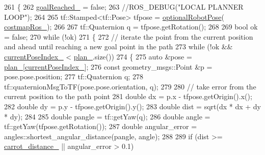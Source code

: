 \begin{DoxyCode}
261 \{
262     \hyperlink{classcl__move__base__z_1_1forward__local__planner_1_1ForwardLocalPlanner_a9d51ad6f0eb364ebd830526280bdf4fc}{goalReached\_} = \textcolor{keyword}{false};
263     \textcolor{comment}{//ROS\_DEBUG("LOCAL PLANNER LOOP");}
264 
265     tf::Stamped<tf::Pose> tfpose = \hyperlink{namespacecl__move__base__z_1_1forward__local__planner_a4c20f9fe0ca67779c53e90182baf4997}{optionalRobotPose}(
      \hyperlink{classcl__move__base__z_1_1forward__local__planner_1_1ForwardLocalPlanner_a37791fea67ce92c6e38e3727311e533b}{costmapRos\_});
266 
267     tf::Quaternion q = tfpose.getRotation();
268 
269     \textcolor{keywordtype}{bool} ok = \textcolor{keyword}{false};
270     \textcolor{keywordflow}{while} (!ok)
271     \{
272         \textcolor{comment}{// iterate the point from the current position and ahead until reaching a new goal point in the
       path}
273         \textcolor{keywordflow}{while} (!ok && \hyperlink{classcl__move__base__z_1_1forward__local__planner_1_1ForwardLocalPlanner_af4019077a7661d10957cca16222547c2}{currentPoseIndex\_} < \hyperlink{classcl__move__base__z_1_1forward__local__planner_1_1ForwardLocalPlanner_a929e5d0a9db3027810beb658a2343560}{plan\_}.size())
274         \{
275             \textcolor{keyword}{auto} &pose = \hyperlink{classcl__move__base__z_1_1forward__local__planner_1_1ForwardLocalPlanner_a929e5d0a9db3027810beb658a2343560}{plan\_}[\hyperlink{classcl__move__base__z_1_1forward__local__planner_1_1ForwardLocalPlanner_af4019077a7661d10957cca16222547c2}{currentPoseIndex\_}];
276             \textcolor{keyword}{const} geometry\_msgs::Point &p = pose.pose.position;
277             tf::Quaternion q;
278             tf::quaternionMsgToTF(pose.pose.orientation, q);
279 
280             \textcolor{comment}{// take error from the current position to the path point}
281             \textcolor{keywordtype}{double} dx = p.x - tfpose.getOrigin().x();
282             \textcolor{keywordtype}{double} dy = p.y - tfpose.getOrigin().y();
283             \textcolor{keywordtype}{double} dist = sqrt(dx * dx + dy * dy);
284 
285             \textcolor{keywordtype}{double} pangle = tf::getYaw(q);
286             \textcolor{keywordtype}{double} angle = tf::getYaw(tfpose.getRotation());
287             \textcolor{keywordtype}{double} angular\_error = angles::shortest\_angular\_distance(pangle, angle);
288 
289             \textcolor{keywordflow}{if} (dist >= \hyperlink{classcl__move__base__z_1_1forward__local__planner_1_1ForwardLocalPlanner_a4101afebb7e2a5eb0a2144a5fb553a92}{carrot\_distance\_} || angular\_error > 0.1)

\end{DoxyCode}
